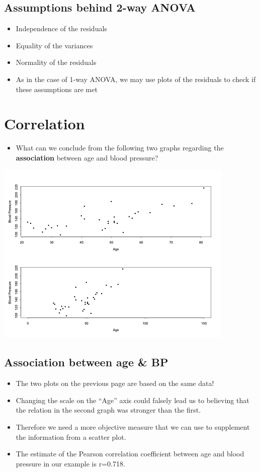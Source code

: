 \documentclass[
]{book}
\providecommand{\tightlist}{%
  \setlength{\itemsep}{0pt}\setlength{\parskip}{0pt}}
\begin{document}
\hypertarget{assumptions-behind-2-way-anova}{%
\subsection{Assumptions behind 2-way ANOVA}\label{assumptions-behind-2-way-anova}}

\begin{itemize}
\tightlist
\item
  Independence of the residuals
\item
  Equality of the variances
\item
  Normality of the residuals
\item
  As in the case of 1-way ANOVA, we may use plots of the residuals to check if these assumptions are met
\end{itemize}

\hypertarget{correlation}{%
\section{Correlation}\label{correlation}}

\begin{itemize}
\tightlist
\item
  What can we conclude from the following two graphs regarding the \textbf{association} between age and blood pressure?
\end{itemize}

\includegraphics[width=0.7\linewidth]{./11_30}

\hypertarget{association-between-age-bp}{%
\subsection{Association between age \& BP}\label{association-between-age-bp}}

\begin{itemize}
\tightlist
\item
  The two plots on the previous page are based on the same data!
\item
  Changing the scale on the ``Age'' axis could falsely lead us to believing that the relation in the second graph was stronger than the first.
\item
  Therefore we need a more objective measure that we can use to supplement the information from a scatter plot.
\item
  The estimate of the Pearson correlation coefficient between age and blood pressure in our example is r=0.718.
\end{itemize}
\end{document}
